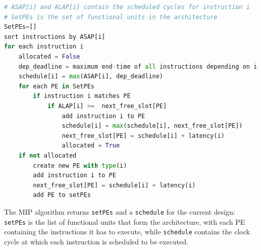\begin{lstlisting}[language=Python, caption={\small Modified Interval Partitioning (MIP) Algorithm}, label={lst:modified_interval_partitioning}, basicstyle=\tiny]
# ASAP[i] and ALAP[i] contain the scheduled cycles for instruction i
# SetPEs is the set of functional units in the architecture
SetPEs=[]
sort instructions by ASAP[i]
for each instruction i
	allocated = False
	dep_deadline = maximum end-time of all instructions depending on i
	schedule[i] = max(ASAP[i], dep_deadline)
	for each PE in SetPEs
		if instruction i matches PE
			if ALAP[i] >=  next_free_slot[PE]
				add instruction i to PE
				schedule[i] = max(schedule[i], next_free_slot[PE])
				next_free_slot[PE] = schedule[i] + latency(i)
				allocated = True
	if not allocated
		create new PE with type(i)
		add instruction i to PE
		next_free_slot[PE] = schedule[i] + latency(i)
		add PE to setPEs
\end{lstlisting}


The MIP algorithm returns \verb|setPEs| and a \verb|schedule| for the current design: \verb|setPEs| is the list of functional units that form the architecture, with each PE containing the instructions it has to execute, while \verb|schedule| contains the clock cycle at which each instruction is scheduled to be executed.

\vspace{-1mm}
